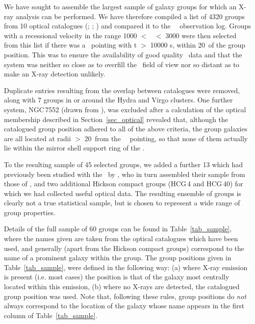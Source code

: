 \documentclass[usenatbib]{mn2e}
\begin{document}
We have sought to assemble the largest sample of galaxy groups for which an X-ray
analysis can be performed.  We have therefore compiled a list of 4320 groups from
10 optical catalogues
(\citealt{hickson82,huchra82,geller83,fouque92,garcia93,nolthenius93,barton96};
\citealt*{ramella97}; \citealt{giudice99,white99})
and compared it to the \ROSAT\ \PSPC\ observation log.  Groups with a recessional
velocity in the range 1000 $<$ \vel\ $<$ 3000 \kmps were then selected from this
list if there was a \PSPC\ pointing with t $>$ 10000 s, within 20\arcm\ of the
group position.  This was to ensure the availability of good quality \ROSAT\ data
and that the system was neither so close as to overfill the \PSPC\ field of view
nor so distant as to make an X-ray detection unlikely.

Duplicate entries resulting from the overlap between catalogues were removed,
along with 7 groups in or around the Hydra and Virgo clusters.  One further
system, NGC\,7552 (drawn from \citet{huchra82}), was excluded after a calculation
of the optical membership described in Section~\ref{sec_optical} revealed that,
although the catalogued group position adhered to all of the above criteria, the
group galaxies are all located at radii $>$ 20\arcm\ from the \ROSAT\ \PSPC\
pointing, so that none of them actually lie within the mirror shell support ring
of the \PSPC. 

To the resulting sample of 45 selected groups, we added a further 13 which had
previously been studied with the \PSPC\ by \citet{helsdon00a}, who in turn
assembled their sample from those of \citet{nolthenius93,ledlow96,mulchaey98},
and two additional Hickson compact groups (HCG\,4 and HCG\,40) for which we had
collected useful optical data. The resulting ensemble of groups is clearly not a
true statistical sample, but is chosen to represent a wide range of group
properties.

Details of the full sample of 60 groups can be found in Table~\ref{tab_sample},
where the names given are taken from the optical catalogues which have been used,
and generally (apart from the Hickson compact groups) correspond to the name of a
prominent galaxy within the group.  The group positions given in
Table~\ref{tab_sample}, were defined in the following way: (a) where X-ray
emission is present (i.e. most cases) the position is that of the galaxy most
centrally located within this emission, (b) where no X-rays are detected, the
catalogued group position was used.  Note that, following these rules, group
positions do {\it not} always correspond to the location of the galaxy whose name
appears in the first column of Table~\ref{tab_sample}.
\end{document}
